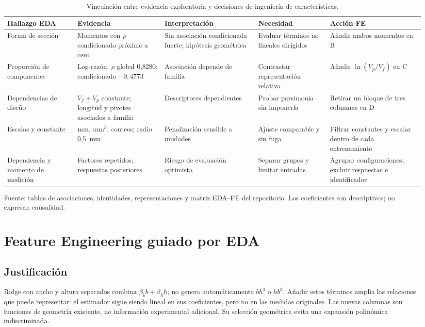 \begin{table}[htbp]
\centering\small{}
\caption{Vinculación entre evidencia exploratoria y decisiones de ingeniería de características.}
\label{tab:eda-fe}
\begin{tabularx}{\linewidth}{@{}YYYYY@{}}
\toprule
Hallazgo EDA & Evidencia & Interpretación & Necesidad & Acción FE \\
\midrule
Forma de sección & Momentos con $\rho$ condicionado próximo a cero & Sin asociación condicionada fuerte; hipótesis geométrica & Evaluar términos no lineales dirigidos & Añadir ambos momentos en B \\
\addlinespace
Proporción de componentes & Log-razón: $\rho$ global 0,8280; condicionado $-0,4773$ & Asociación depende de familia & Contrastar representación relativa & Añadir $\ln(V_p/V_f)$ en C \\
\addlinespace
Dependencias de diseño & $V_f+V_p$ constante; longitud y pivotes asociados a familia & Descriptores dependientes & Probar parsimonia sin imponerla & Retirar un bloque de tres columnas en D \\
\addlinespace
Escalas y constante & mm, mm$^3$, conteos; radio 0,5~mm & Penalización sensible a unidades & Ajuste comparable y sin fuga & Filtrar constantes y escalar dentro de cada entrenamiento \\
\addlinespace
Dependencia y momento de medición & Factores repetidos; respuestas posteriores & Riesgo de evaluación optimista & Separar grupos y limitar entradas & Agrupar configuraciones; excluir respuestas e identificador \\
\bottomrule
\end{tabularx}
\par\smallskip\small Fuente: tablas de asociaciones, identidades, representaciones y matriz EDA--FE del repositorio. Los coeficientes son descriptivos; no expresan causalidad.
\end{table}

\section{Feature Engineering guiado por EDA}
\label{sec:fe}

\subsection{Justificación}
Ridge con ancho y altura separados combina $\beta_b b+\beta_h h$; no genera automáticamente $bh^3$ o $hb^3$. Añadir estos términos amplía las relaciones que puede representar: el estimador sigue siendo lineal en sus coeficientes, pero no en las medidas originales. Las nuevas columnas son funciones de geometría existente, no información experimental adicional. Su selección geométrica evita una expansión polinómica indiscriminada.

